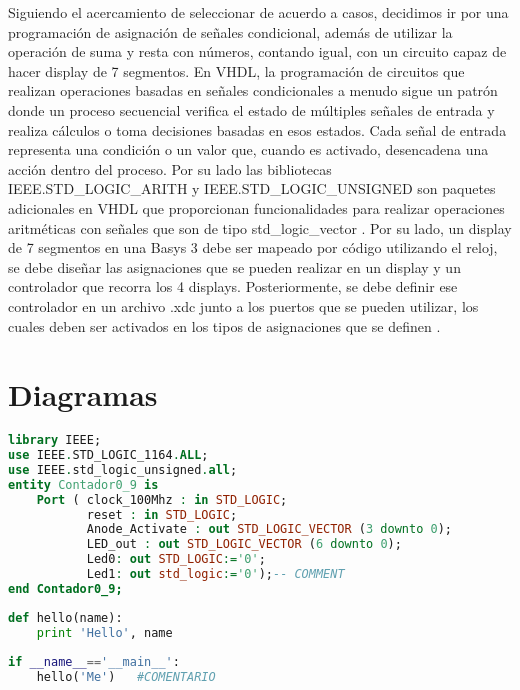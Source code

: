 \documentclass[12pt]{article}  %
\begin{document}
Siguiendo el acercamiento de seleccionar de acuerdo a casos, decidimos ir por una programación de asignación de señales condicional, además de utilizar la operación de suma y resta con números, contando igual, con un circuito capaz de hacer display de 7 segmentos. En VHDL, la programación de circuitos que realizan operaciones basadas en señales condicionales a menudo sigue un patrón donde un proceso secuencial verifica el estado de múltiples señales de entrada y realiza cálculos o toma decisiones basadas en esos estados. Cada señal de entrada representa una condición o un valor que, cuando es activado, desencadena una acción dentro del proceso. Por su lado las bibliotecas IEEE.STD\_LOGIC\_ARITH y IEEE.STD\_LOGIC\_UNSIGNED son paquetes adicionales en VHDL que proporcionan funcionalidades para realizar operaciones aritméticas con señales que son de tipo std\_logic\_vector \cite{unlp2018}. Por su lado, un display de 7 segmentos en una Basys 3 debe ser mapeado por código utilizando el reloj, se debe diseñar las asignaciones que se pueden realizar en un display y un controlador que recorra los 4 displays. Posteriormente, se debe definir ese controlador en un archivo .xdc junto a los puertos que se pueden utilizar, los cuales deben ser activados en los tipos de asignaciones que se definen \cite{digilent2023}.

\section{Diagramas}




\begin{lstlisting}[language=VHDL, caption=Código en VHDL]
  library IEEE;
use IEEE.STD_LOGIC_1164.ALL;
use IEEE.std_logic_unsigned.all;
entity Contador0_9 is
    Port ( clock_100Mhz : in STD_LOGIC;
           reset : in STD_LOGIC;
           Anode_Activate : out STD_LOGIC_VECTOR (3 downto 0);
           LED_out : out STD_LOGIC_VECTOR (6 downto 0);
           Led0: out STD_LOGIC:='0';
           Led1: out std_logic:='0');-- COMMENT
end Contador0_9;
\end{lstlisting}

\begin{lstlisting}[language=Python, caption=Código en Python]
  def hello(name):
    print 'Hello', name
 
if __name__=='__main__':
    hello('Me')   #COMENTARIO 
\end{lstlisting}
\end{document}
